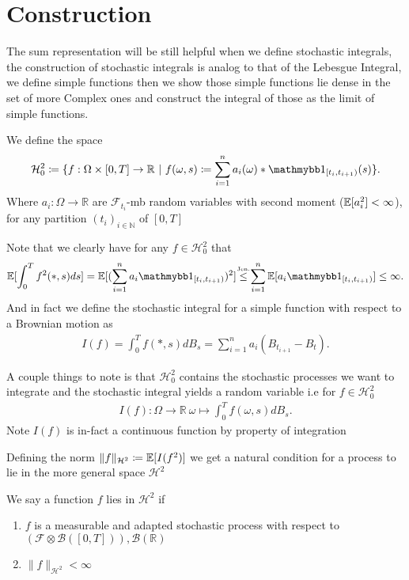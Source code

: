 \section{Construction}
The sum representation will be still helpful when we define stochastic integrals, the construction 
of stochastic integrals is analog to that of the Lebesgue Integral, we define simple functions 
then we show those simple functions lie dense in the set of more Complex ones and construct
the integral of those as the limit of simple functions.
\begin{definition}
  We define the space
  \begin{align*}
    \mathcal{H}_0^{2} \coloneqq  \{f : \Omega \times [0,T] \to  \mathbb{R} \ |\ f(\omega ,s) \coloneqq  \sum_{i=1}^{n} a_i(\omega )*\cha_{[t_i,t_{i+1})}(s)   \}   
  .\end{align*} 
  Where $a_i : \Omega  \to  \mathbb{R}$ are $\mathcal{F}_{t_i}$-mb random variables with second moment ($\mathbb{E}[a_i^2]< \infty$), for any partition $(t_i)_{i \in  \mathbb{N}}$ of $[0,T]$
\end{definition}
Note that we clearly have for any $f \in  \mathcal{H}_0^2$ that 
\begin{align*}
  \E[\int_0^{T} f^2(*,s) ds ] = \E[(\sum_{i=1}^{n} a_i \cha_{[t_i,t_{i+1})})^2] \myS{Jen.}{\le } \sum_{i=1}^{n} \E[a_i \cha_{[t_i,t_{i+1})}]  \le  \infty
.\end{align*}
And in fact we define the stochastic integral for a simple function with respect to a  Brownian motion  as
\begin{align*}
  I(f) = \int_0^{T}  f(*,s) dB_{s}  = \sum_{i=1}^{n} a_i(B_{t_{i+1}} - B_t)
.\end{align*}
\begin{remark}
 A couple things to note is that $\mathcal{H}_0^{2} $ contains the stochastic processes we want to integrate and 
 the stochastic integral yields a random variable i.e for $f \in  \mathcal{H}_0^{2} $
 \begin{align*}
   I(f) : \Omega \to \mathbb{R} \ \omega  \mapsto \int_0^{T} f(\omega ,s) dB_s
 .\end{align*}
 Note $I(f)$ is in-fact a continuous function by property of integration
\end{remark}
Defining the norm $\|f\|_{\mathcal{H}^2} \coloneqq  \mathbb{E}[I(f^2)]$ we get a natural condition for a process to lie in the more general space 
$\mathcal{H}^2$ 
\begin{definition}
 We say a function $f$ lies in $\mathcal{H}^2$  if 
 \begin{enumerate}
   \item $f$ is a measurable and adapted stochastic process with respect to $(\mathcal{F} \otimes \mathcal{B}([0,T])),\mathcal{B}(\mathbb{R})$
   \item $\|f\|_{\mathcal{H}^2} < \infty$
 \end{enumerate}
\end{definition}
